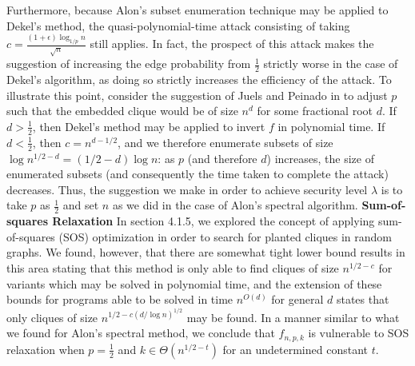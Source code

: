\documentclass{article}
\theoremstyle{definition}
\begin{document}
Furthermore, because Alon's subset enumeration technique may be applied to Dekel's method, the quasi-polynomial-time attack consisting of taking 
$c=\frac{(1+\epsilon)\log_{1/p}{n}}{\sqrt{n}}$ still applies.  In fact, the prospect 
of this attack makes the suggestion of increasing the edge probability from $\frac{1}{2}$
strictly worse in the case of Dekel's algorithm, as doing so strictly increases the 
efficiency of the attack.  To illustrate this point, consider the suggestion of 
Juels and Peinado in \cite{HidingCliques} to adjust $p$ such that the embedded clique 
would be of size $n^d$ for some fractional root $d$.  If $d > \frac{1}{2}$, then 
Dekel's method may be applied to invert $f$ in polynomial time.  If $d < \frac{1}{2}$, 
then $c = n^{d-1/2}$, and we therefore enumerate subsets of size 
$\log{n^{1/2-d}} = (1/2-d)\log{n}$: as $p$ (and therefore $d$) increases, 
the size of enumerated subsets (and consequently the time taken to complete the 
attack) decreases.  Thus, the suggestion we make in order to achieve security level $\lambda$ 
is to take $p$ as $\frac{1}{2}$ and set $n$ as we did in the case of Alon's spectral algorithm.
\newline\newline
\noindent \textbf{Sum-of-squares Relaxation } In section 4.1.5, we explored 
the concept of applying sum-of-squares (SOS) optimization in order to search
for planted cliques in random graphs.  We found, however, that there are somewhat
tight lower bound results in this area stating that this method is only 
able to find cliques of size $n^{1/2 - c}$ for variants which may be solved in 
polynomial time, and the extension of these bounds for programs able to be solved
in time $n^{O(d)}$ for general $d$ states that only cliques of size 
$n^{1/2-c(d/\log{n})^{1/2}}$ may be found.  In a manner similar to what we found 
for Alon's spectral method, we conclude that $f_{n,p,k}$ is vulnerable to 
SOS relaxation when $p=\frac{1}{2}$ and $k \in \Theta(n^{1/2-t})$ for an undetermined 
constant $t$.
\end{document}

